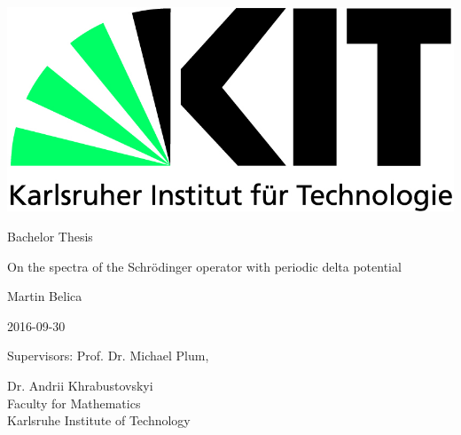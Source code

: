 \begin{titlepage}
  \includegraphics[scale=0.45]{kit-logo.jpg}
  \vspace*{2cm} 

  \begin{center} \large 
    
    Bachelor Thesis
    \vspace*{2cm}

    {\huge On the spectra of the Schrödinger operator with periodic delta potential}
    \vspace*{2.5cm}

    Martin Belica
    \vspace*{0.125cm}

    2016-09-30
    \vspace*{4.25cm}


    Supervisors: Prof. Dr. Michael Plum,
    \vspace*{0.125cm}
    
    Dr. Andrii Khrabustovskyi \\[1cm]
    Faculty for Mathematics \\[1cm]
	Karlsruhe Institute of Technology
  \end{center}
\end{titlepage}